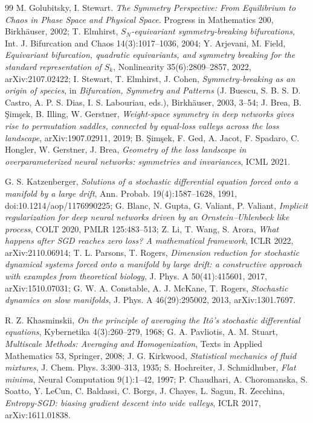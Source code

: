 \begin{thebibliography}{99}
M. Golubitsky, I. Stewart.
\emph{The Symmetry Perspective: From Equilibrium to Chaos in Phase Space and Physical Space}.
Progress in Mathematics 200, Birkh\"auser, 2002;
T. Elmhirst, \emph{$S_N$-equivariant symmetry-breaking bifurcations}, Int. J. Bifurcation and Chaos
14(3):1017--1036, 2004;
Y. Arjevani, M. Field, \emph{Equivariant bifurcation, quadratic equivariants, and symmetry breaking for the standard
representation of $S_k$}, Nonlinearity 35(6):2809--2857, 2022, arXiv:2107.02422;
I. Stewart, T. Elmhirst, J. Cohen, \emph{Symmetry-breaking as an origin of species}, in \emph{Bifurcation, Symmetry
and Patterns} (J. Buescu, S. B. S. D. Castro, A. P. S. Dias, I. S. Labouriau, eds.), Birkh\"auser, 2003, 3--54;
J. Brea, B. \c{S}im\c{s}ek, B. Illing, W. Gerstner, \emph{Weight-space symmetry in deep networks gives rise to
permutation saddles, connected by equal-loss valleys across the loss landscape}, arXiv:1907.02911, 2019;
B. \c{S}im\c{s}ek, F. Ged, A. Jacot, F. Spadaro, C. Hongler, W. Gerstner, J. Brea, \emph{Geometry of the loss
landscape in overparameterized neural networks: symmetries and invariances}, ICML 2021.

G. S. Katzenberger, \emph{Solutions of a stochastic differential equation forced onto a manifold by a large drift},
Ann. Probab. 19(4):1587--1628, 1991, doi:10.1214/aop/1176990225;
G. Blanc, N. Gupta, G. Valiant, P. Valiant, \emph{Implicit regularization for deep neural networks driven by an
Ornstein--Uhlenbeck like process}, COLT 2020, PMLR 125:483--513;
Z. Li, T. Wang, S. Arora, \emph{What happens after SGD reaches zero loss? A mathematical framework}, ICLR 2022,
arXiv:2110.06914;
T. L. Parsons, T. Rogers, \emph{Dimension reduction for stochastic dynamical systems forced onto a manifold by large
drift: a constructive approach with examples from theoretical biology}, J. Phys. A 50(41):415601, 2017,
arXiv:1510.07031;
G. W. A. Constable, A. J. McKane, T. Rogers, \emph{Stochastic dynamics on slow manifolds}, J. Phys. A 46(29):295002,
2013, arXiv:1301.7697.

R. Z. Khasminskii, \emph{On the principle of averaging the It\^o's stochastic differential equations}, Kybernetika
4(3):260--279, 1968;
G. A. Pavliotis, A. M. Stuart, \emph{Multiscale Methods: Averaging and Homogenization}, Texts in Applied Mathematics
53, Springer, 2008;
J. G. Kirkwood, \emph{Statistical mechanics of fluid mixtures}, J. Chem. Phys. 3:300--313, 1935;
S. Hochreiter, J. Schmidhuber, \emph{Flat minima}, Neural Computation 9(1):1--42, 1997;
P. Chaudhari, A. Choromanska, S. Soatto, Y. LeCun, C. Baldassi, C. Borgs, J. Chayes, L. Sagun, R. Zecchina,
\emph{Entropy-SGD: biasing gradient descent into wide valleys}, ICLR 2017, arXiv:1611.01838.


\end{thebibliography}
